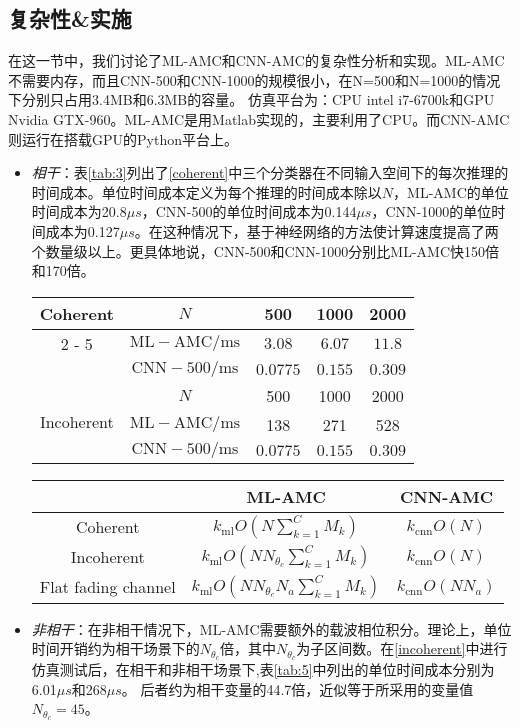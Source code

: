 \documentclass[final]{cvpr}
\begin{document}
\subsection{复杂性\&实施}\label{Compimple}

在这一节中，我们讨论了ML-AMC和CNN-AMC的复杂性分析和实现。ML-AMC不需要内存，而且CNN-500和CNN-1000的规模很小，在N=500和N=1000的情况下分别只占用3.4MB和6.3MB的容量。
仿真平台为：CPU intel i7-6700k和GPU Nvidia GTX-960。ML-AMC是用Matlab实现的，主要利用了CPU。而CNN-AMC则运行在搭载GPU的Python平台上。
\begin{itemize}
    \item \textit{相干}：表\ref{tab:3}列出了\ref{coherent}中三个分类器在不同输入空间下的每次推理的时间成本。单位时间成本定义为每个推理的时间成本除以$N$，ML-AMC的单位时间成本为20.8$\mu s$，CNN-500的单位时间成本为0.144$\mu s$，CNN-1000的单位时间成本为0.127$\mu s$。在这种情况下，基于神经网络的方法使计算速度提高了两个数量级以上。更具体地说，CNN-500和CNN-1000分别比ML-AMC快150倍和170倍。
    \begin{table*}[htbp]
\centering
\caption{四种调制方案分类的平均时间开销}
\begin{tabular}{c|c|c|c|c}
\hline \multirow{3}{*}{ Coherent } & $N$ & 500 & 1000 & 2000 \\
\cline { 2 - 5 } & $\mathrm{ML}-\mathrm{AMC} / \mathrm{ms}$ & $3.08$ & $6.07$ & $11.8$ \\
& $\mathrm{CNN}-500 / \mathrm{ms}$ & $0.0775$ & $0.155$ & $0.309$ \\
\hline \multirow{3}{*}{ Incoherent } & $N$ & 500 & 1000 & 2000 \\
\cline { 2 - 5 } & $\mathrm{ML}-\mathrm{AMC} / \mathrm{ms}$ & 138 & 271 & 528 \\
& $\mathrm{CNN}-500 / \mathrm{ms}$ & $0.0775$ & $0.155$ & $0.309$ \\
\hline
\end{tabular}\label{tab:4}
\end{table*}
    \begin{table*}[htbp]
\centering
\caption{四种调制方案分类的平均时间开销}
\begin{tabular}{c|c|c}
\hline & ML-AMC & CNN-AMC \\
\hline Coherent & $k_{\mathrm{ml}} O\left(N \sum_{k=1}^{C} M_{k}\right)$ & $k_{\mathrm{cnn}} O(N)$ \\
\hline Incoherent & $k_{\mathrm{ml}} O\left(N N_{\theta_{c}} \sum_{k=1}^{C} M_{k}\right)$ & $k_{\mathrm{cnn}} O(N)$ \\
\hline Flat fading channel & $k_{\mathrm{ml}} O\left(N N_{\theta_{c}} N_{a} \sum_{k=1}^{C} M_{k}\right)$ & $k_{\mathrm{cnn}} O\left(N N_{a}\right)$ \\
\hline
\end{tabular}\label{tab:5}
\end{table*}
\item \textit{非相干}：在非相干情况下，ML-AMC需要额外的载波相位积分。理论上，单位时间开销约为相干场景下的$N_{θ_c}$倍，其中$N_{θ_c}$为子区间数。在\ref{incoherent}中进行仿真测试后，在相干和非相干场景下,表\ref{tab:5}中列出的单位时间成本分别为6.01$\mu s$和268$\mu s$。
后者约为相干变量的44.7倍，近似等于所采用的变量值$N_{θ_c}=45$。


\end{itemize}
\end{document}
